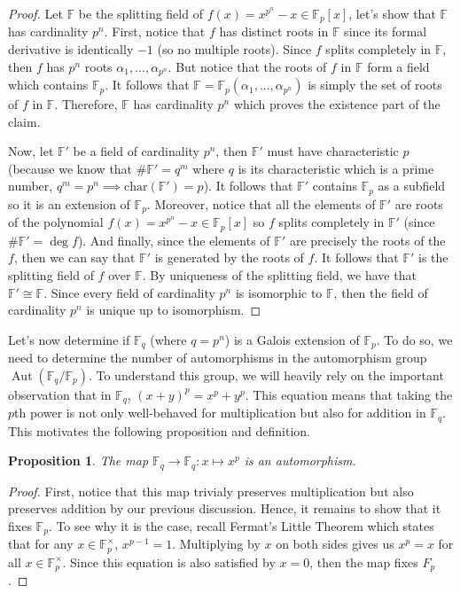 \documentclass{article}
\newtheorem*{proposition}{Proposition}
\newcommand{\F}{\mathbb{F}}
\DeclareMathOperator{\Aut}{\text{Aut}}
\newcommand{\isomorphic}{\cong}
\begin{document}
\begin{proof}
    Let $\F$ be the splitting field of $f(x) = x^{p^n} - x \in \F_p[x]$, let's show that $\F$ has cardinality $p^n$. First, notice that $f$ has distinct roots in $\F$ since its formal derivative is identically $-1$ (so no multiple roots). Since $f$ splits completely in $\F$, then $f$ has $p^n$ roots $\alpha_1, ..., \alpha_{p^n}$. But notice that the roots of $f$ in $\F$ form a field which contains $\F_p$. It follows that $\F = \F_p(\alpha_1, ..., \alpha_{p^n})$ is simply the set of roots of $f$ in $\F$. Therefore, $\F$ has cardinality $p^n$ which proves the existence part of the claim.
    
    Now, let $\F'$ be a field of cardinality $p^n$, then $\F'$ must have characteristic $p$ (because we know that $\# \F' = q^m$ where $q$ is its characteristic which is a prime number, $q^m = p^n \implies \text{char}(\F') = p$). It follows that $\F'$ contains $\F_p$ as a subfield so it is an extension of $\F_p$. Moreover, notice that all the elements of $\F'$ are roots of the polynomial $f(x) = x^{p^n} - x \in \F_p[x]$ so $f$ splits completely in $\F'$ (since $\# \F' = \deg f$). And finally, since the elements of $\F'$ are precisely the roots of the $f$, then we can say that $\F'$ is generated by the roots of $f$. It follows that $\F'$ is the splitting field of $f$ over $\F$. By uniqueness of the splitting field, we have that $\F' \isomorphic \F$. Since every field of cardinality $p^n$ is isomorphic to $\F$, then the field of cardinality $p^n$ is unique up to isomorphism. 
\end{proof}

Let's now determine if $\F_q$ (where $q = p^n$) is a Galois extension of $\F_p$. To do so, we need to determine the number of automorphisms in the automorphism group $\Aut(\F_q / \F_p)$. To understand this group, we will heavily rely on the important observation that in $\F_q$, $(x + y)^p = x^p + y^p$. This equation means that taking the $p$th power is not only well-behaved for multiplication but also for addition in $\F_q$. This motivates the following proposition and definition.

\begin{proposition}
    The map $\F_q \to \F_q : x \mapsto x^p$ is an automorphism.
\end{proposition}

\begin{proof}
    First, notice that this map trivialy preserves multiplication but also preserves addition by our previous discussion. Hence, it remains to show that it fixes $\F_p$. To see why it is the case, recall Fermat's Little Theorem which states that for any $x \in \F_p^{\times}$, $x^{p-1} = 1$. Multiplying by $x$ on both sides gives us $x^p = x$ for all $x \in \F_p^{\times}$. Since this equation is also satisfied by $x = 0$, then the map fixes $F_p$. 
\end{proof}
\end{document}
